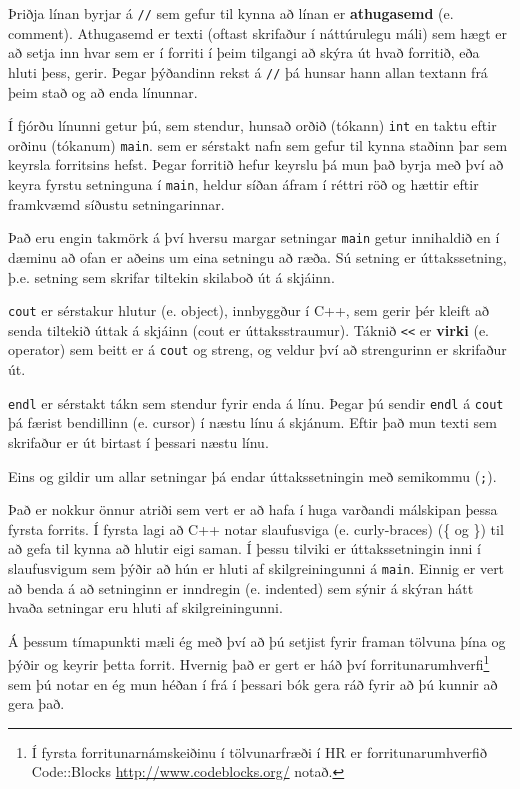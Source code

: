 
Þriðja línan byrjar á  {\tt //} sem gefur til kynna að línan er {\bf athugasemd} (e. comment).
Athugasemd er texti (oftast skrifaður í náttúrulegu máli) sem hægt er að setja inn hvar sem er í forriti í þeim tilgangi að skýra út hvað forritið, eða hluti þess, gerir.
Þegar þýðandinn rekst á {\tt //} þá hunsar hann allan textann frá þeim stað og að enda línunnar.

Í fjórðu línunni getur þú, sem stendur, hunsað orðið (tókann) {\tt int} en taktu eftir orðinu (tókanum) {\tt main}.
sem er sérstakt nafn sem gefur til kynna staðinn þar sem keyrsla forritsins hefst.
Þegar forritið hefur keyrslu þá mun það byrja með því að keyra fyrstu setninguna í {\tt main}, heldur síðan áfram í réttri röð og hættir eftir framkvæmd síðustu setningarinnar.


Það eru engin takmörk á því hversu margar setningar {\tt main} getur innihaldið en í dæminu að ofan er aðeins um eina setningu að ræða.
Sú setning er úttakssetning, þ.e. setning sem skrifar tiltekin skilaboð út á skjáinn. 

{\tt cout} er sérstakur hlutur (e. object), innbyggður í C++, sem gerir þér kleift að senda tiltekið úttak á skjáinn (cout er úttaksstraumur).
Táknið {\tt <<} er {\bf virki} (e. operator) sem beitt er á {\tt cout} og streng, og veldur því að strengurinn er skrifaður út. 


{\tt endl} er sérstakt tákn sem stendur fyrir enda á línu.
Þegar þú sendir {\tt endl} á {\tt cout} þá færist bendillinn (e. cursor) í næstu línu á skjánum.
Eftir það mun texti sem skrifaður er út birtast í þessari næstu línu. 

Eins og gildir um allar setningar þá endar úttakssetningin með semikommu ({\tt ;}).

Það er nokkur önnur atriði sem vert er að hafa í huga varðandi málskipan þessa fyrsta forrits.
Í fyrsta lagi að C++ notar slaufusviga (e. curly-braces) (\{ og
\}) til að gefa til kynna að hlutir eigi saman.
Í þessu tilviki er úttakssetningin inni í slaufusvigum sem þýðir að 
hún er hluti af skilgreiningunni á {\tt main}. 
Einnig er vert að benda á að setninginn er inndregin (e. indented) sem sýnir á skýran hátt hvaða setningar eru hluti af skilgreiningunni.

Á þessum tímapunkti mæli ég með því að þú setjist fyrir framan tölvuna þína og þýðir og keyrir þetta forrit.
Hvernig það er gert er háð því forritunarumhverfi\footnote{Í fyrsta forritunarnámskeiðinu í tölvunarfræði í HR er forritunarumhverfið Code::Blocks \url{http://www.codeblocks.org/} notað.} sem þú notar en ég mun héðan í frá í þessari bók gera ráð fyrir að þú kunnir að gera það.


